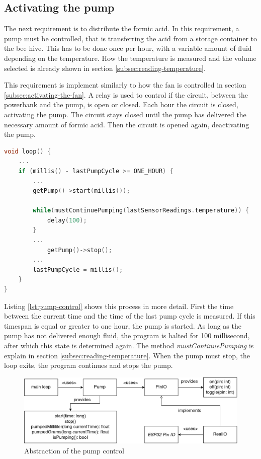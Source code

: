 \subsection{Activating the pump}\label{subsec:activating-the-pump}

The next requirement is to distribute the formic acid.
In this requirement, a pump must be controlled, that is transferring the acid from a storage container to the bee hive.
This has to be done once per hour, with a variable amount of fluid depending on the temperature.
How the temperature is measured and the volume selected is already shown in section \ref{subsec:reading-temperature}.

This requirement is implement similarly to how the fan is controlled in section \ref{subsec:activating-the-fan}.
A relay is used to control if the circuit, between the powerbank and the pump, is open or closed.
Each hour the circuit is closed, activating the pump.
The circuit stays closed until the pump has delivered the necessary amount of formic acid.
Then the circuit is opened again, deactivating the pump.

\begin{lstlisting}[label={lst:pump-control},language=C++, caption=Controling the pump]
void loop() {
    ...
    if (millis() - lastPumpCycle >= ONE_HOUR) {
        ...
        getPump()->start(millis());

        while(mustContinuePumping(lastSensorReadings.temperature)) {
            delay(100);
        }
        ...
            getPump()->stop();
        ...
        lastPumpCycle = millis();
    }
}
\end{lstlisting}

Listing \ref{lst:pump-control} shows this process in more detail.
First the time between the current time and the time of the last pump cycle is measured.
If this timespan is equal or greater to one hour, the pump is started.
As long as the pump has not delivered enough fluid, the program is halted for 100 millisecond, after which this state is determined again.
The method \textit{mustContinuePumping} is explain in section \ref{subsec:reading-temperature}.
When the pump must stop, the loop exits, the program continues and stops the pump.

\begin{figure}
    \centering
    \includegraphics[width=\textwidth]{img/pump-control}
    \caption{Abstraction of the pump control}
    \label{fig:abstraction-of-pump}
\end{figure}

